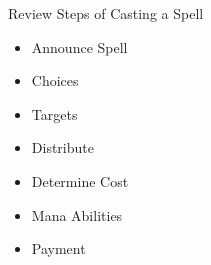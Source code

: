 \documentclass[utf8x]{beamer}
\begin{document}
    \begin{frame}{Review Steps of Casting a Spell}
      \begin{itemize}
        \item Announce Spell
        \item Choices
        \item Targets
        \item Distribute
        \item Determine Cost
        \item Mana Abilities
        \item Payment
      \end{itemize}
    \end{frame}



    \begin{frame}[plain]
  \titlepage
\end{frame}
  
\end{document}
